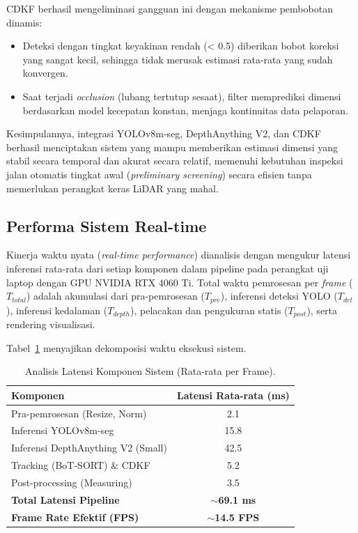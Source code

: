 \documentclass{iopjournal}
\begin{document}
CDKF berhasil mengeliminasi gangguan ini dengan mekanisme pembobotan dinamis:
\begin{itemize}
    \item Deteksi dengan tingkat keyakinan rendah (< 0.5) diberikan bobot koreksi yang sangat kecil, sehingga tidak merusak estimasi rata-rata yang sudah konvergen.
    \item Saat terjadi \textit{occlusion} (lubang tertutup sesaat), filter memprediksi dimensi berdasarkan model kecepatan konstan, menjaga kontinuitas data pelaporan.
\end{itemize}

Kesimpulannya, integrasi YOLOv8m-seg, DepthAnything V2, dan CDKF berhasil menciptakan sistem yang mampu memberikan estimasi dimensi yang stabil secara temporal dan akurat secara relatif, memenuhi kebutuhan inspeksi jalan otomatis tingkat awal (\textit{preliminary screening}) secara efisien tanpa memerlukan perangkat keras LiDAR yang mahal.

\subsection{Performa Sistem Real-time}
\label{sec:runtime_performance}

Kinerja waktu nyata (\textit{real-time performance}) dianalisis dengan mengukur latensi inferensi rata-rata dari setiap komponen dalam pipeline pada perangkat uji laptop dengan GPU NVIDIA RTX 4060 Ti. Total waktu pemrosesan per \textit{frame} ($T_{total}$) adalah akumulasi dari pra-pemrosesan ($T_{pre}$), inferensi deteksi YOLO ($T_{det}$), inferensi kedalaman ($T_{depth}$), pelacakan dan pengukuran statis ($T_{post}$), serta rendering visualisasi.

Tabel~\ref{tab:latency_breakdown} menyajikan dekomposisi waktu eksekusi sistem.

\begin{table}[h]
\caption{\label{tab:latency_breakdown}Analisis Latensi Komponen Sistem (Rata-rata per Frame).}
\begin{center}
\begin{tabular}{lc}
\toprule
Komponen & Latensi Rata-rata (ms) \\
\midrule
Pra-pemrosesan (Resize, Norm) & 2.1 \\
Inferensi YOLOv8m-seg & 15.8 \\
Inferensi DepthAnything V2 (Small) & 42.5 \\
Tracking (BoT-SORT) \& CDKF & 5.2 \\
Post-processing (Measuring) & 3.5 \\
\midrule
\textbf{Total Latensi Pipeline} & \textbf{$\sim$69.1 ms} \\
\textbf{Frame Rate Efektif (FPS)} & \textbf{$\sim$14.5 FPS} \\
\bottomrule
\end{tabular}
\end{center}
\end{table}
\end{document}
